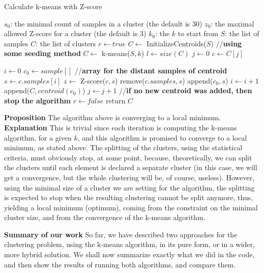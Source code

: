 \documentclass[12pt]{article}
\begin{document}
\begin{algorithm}
\caption{Calculate k-means with Z-score}
\begin{algorithmic} 
\REQUIRE
\STATE $s_0$: the minimal count of samples in a cluster (the default is 30)
\STATE $z_0$: the maximal allowed Z-score for a cluster (the default is 3)
\STATE $k_0$: the $k$ to start from
\STATE $S$: the list of samples
\ENSURE $C$: the list of clusters
\STATE $r \leftarrow true$
\newline
\STATE $C \leftarrow $ InitializeCentroids($S$) //\textbf{using some seeding method}
\STATE $C \leftarrow $ k-means($S, k$)
\STATE $l \leftarrow size(C)$
\STATE $j \leftarrow 0$
\STATE $c \leftarrow C[j]$

\STATE $i \leftarrow 0$
\STATE $c_0 \leftarrow sample[]$ //\textbf{array for the distant samples of centroid}
\STATE $s \leftarrow c.samples[i]$
\STATE $z \leftarrow $ Z-score($c,s$)
\STATE remove($c.samples,s$)
\STATE append($c_0,s$)
\ENDIF
\STATE $i \leftarrow i+1$
\ENDWHILE
{}
\STATE append($C,centroid(c_0)$)
\ENDIF
\STATE $j \leftarrow j+1$
\ENDWHILE
\newline
//\textbf{if no new centroid was added, then stop the algorithm}
\STATE $r \leftarrow false$
\ENDIF
\ENDWHILE
\STATE return $C$
\end{algorithmic}
\end{algorithm}
\newpage
\textbf{Proposition} The algorithm above is converging to a local minimum.\newline
\textbf{Explanation} This is trivial since each iteration is computing the k-means algorithm, for a given $k$, and this algorithm is promised to converge to a local minimum, as stated above. \newline
The splitting of the clusters, using the statistical criteria, must obviously stop, at some point, because, theoretically, we can split the clusters until each element is declared a separate cluster (in this case, we will get a convergence, but the whole clustering will be, of course, useless). However, using the minimal size of a cluster we are setting for the algorithm, the splitting is expected to stop when the resulting clustering cannot be split anymore, thus, yielding a local minimum (optimum), coming from the constraint on the minimal cluster size, and from the convergence of the k-means algorithm. \newline
\newpage

\textbf{\large Summary of our work} \newline
So far, we have described two approaches for the clustering problem, using the k-means algorithm, in its pure form, or in a wider, more hybrid solution. \newline
We shall now summarize exactly what we did in the code, and then show the results of running both algorithms, and compare them. \newline
\end{document}
